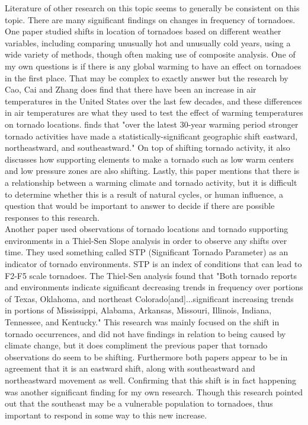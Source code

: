 \documentclass[12pt,english]{article}
\begin{document}
\hspace{1cm} Literature of other research on this topic seems to generally be consistent on this topic. There are many significant findings on changes in frequency of tornadoes. One paper studied shifts in location of tornadoes based on different weather variables, including comparing unusually hot and unusually cold years, using a wide variety of methods, though often making use of composite analysis. One of my own questions is if there is any global warming to have an effect on tornadoes in the first place. That may be complex to exactly answer but the research by Cao, Cai and Zhang does find that there have been an increase in air temperatures in the United States over the last few decades, and these differences in air temperatures are what they used to test the effect of warming temperatures on tornado locations. finds that "over the latest 30-year warming period stronger tornado activities have made a statistically-significant geographic shift eastward, northeastward, and southeastward."\cite{Cao2021} On top of shifting tornado activity, it also discusses how supporting elements to make a tornado such as low warm centers and low pressure zones are also shifting. Lastly, this paper mentions that there is a relationship between a warming climate and tornado activity, but it is difficult to determine whether this is a result of natural cycles, or human influence, a question that would be important to answer to decide if there are possible responses to this research. \\
Another paper used observations of tornado locations and tornado supporting environments in a Thiel-Sen Slope analysis in order to observe any shifts over time. They used something called STP (Significant Tornado Parameter) as an indicator of tornado environments. STP is an index of conditions that can lead to F2-F5 scale tornadoes\cite{noaa}. The Thiel-Sen analysis found that "Both tornado reports and environments indicate significant decreasing trends in frequency over portions of Texas, Oklahoma, and northeast Colorado[and]...significant increasing trends in portions of Mississippi, Alabama, Arkansas, Missouri, Illinois, Indiana, Tennessee, and Kentucky."\cite{Vittorio2018}  This research was mainly focused on the shift in tornado occurrences, and did not have findings in relation to being caused by climate change, but it does compliment the previous paper that tornado observations do seem to be shifting. Furthermore both papers appear to be in agreement that it is an eastward shift, along with southeastward and northeastward movement as well. Confirming that this shift is in fact happening was another significant finding for my own research. Though this research pointed out that the southeast may be a vulnerable population to tornadoes, thus important to respond in some way to this new increase. \\
\end{document}
